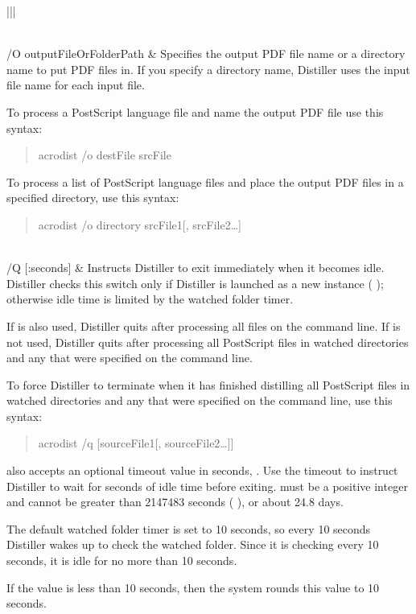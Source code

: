 \documentclass[letterpaper,12pt,english,openany,oneside]{sphinxmanual}
\begin{document}
\begin{savenotes}
\begin{tabular}[t]{|*{2}{|}}
\begin{itemize}
\end{itemize}
\\
\hline
/O outputFileOrFolderPath
&
Specifies the output PDF file name or a directory name to put PDF files in. If you specify a directory name, Distiller uses the input file name for each input file.

To process a PostScript language file and name the output PDF file use this syntax:
\begin{quote}

acrodist /o destFile srcFile
\end{quote}

To process a list of PostScript language files and place the output PDF files in a specified directory, use this syntax:
\begin{quote}

acrodist /o directory srcFile1{[}, srcFile2…{]}
\end{quote}
\\
\hline
/Q {[}:seconds{]}
&
Instructs Distiller to exit immediately when it becomes idle. Distiller checks this switch only if Distiller is launched as a new instance ( ); otherwise idle time is limited by the watched folder timer.

If  is also used, Distiller quits after processing all files on the command line. If  is not used, Distiller quits after processing all PostScript files in watched directories and any that were specified on the command line.

To force Distiller to terminate when it has finished distilling all PostScript files in watched directories and any that were specified on the command line, use this syntax:
\begin{quote}

acrodist /q {[}sourceFile1{[}, sourceFile2…{]}{]}
\end{quote}

 also accepts an optional timeout value in seconds,  . Use the timeout to instruct Distiller to wait for  seconds of idle time before exiting.  must be a positive integer and cannot be greater than 2147483 seconds ( ), or about 24.8 days.

The default watched folder timer is set to 10 seconds, so every 10 seconds Distiller wakes up to check the watched folder. Since it is checking every 10 seconds, it is idle for no more than 10 seconds.

If the  value is less than 10 seconds, then the system rounds this value to 10 seconds.
\\
\hline
\end{tabular}
\par
\sphinxattableend\end{savenotes}
\end{document}
